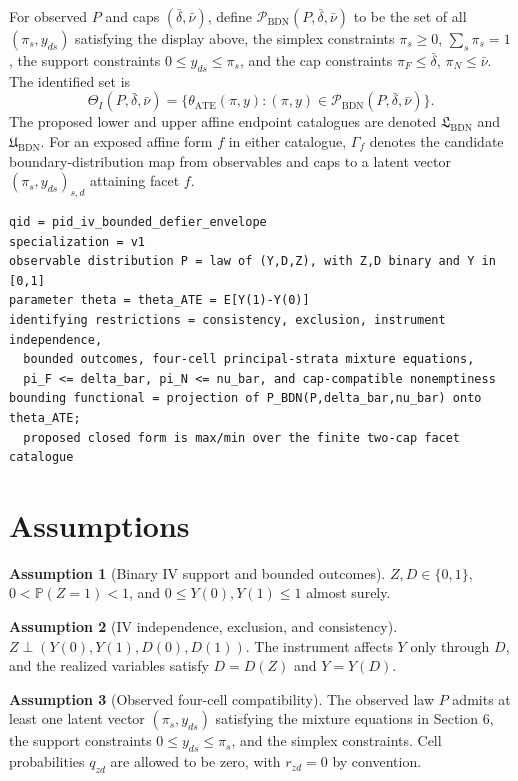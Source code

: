 \documentclass[11pt]{article}
\renewcommand{\Pr}{\mathbb{P}}
\theoremstyle{definition}
\newtheorem{assumption}{Assumption}
\theoremstyle{plain}
\theoremstyle{remark}
\begin{document}
For observed \(P\) and caps \((\bar\delta,\bar\nu)\), define
\(\mathcal{P}_{\mathrm{BDN}}(P,\bar\delta,\bar\nu)\) to be the set of all
\((\pi_s,y_{ds})\) satisfying the display above, the simplex constraints
\(\pi_s\ge0\), \(\sum_s\pi_s=1\), the support constraints
\(0\le y_{ds}\le\pi_s\), and the cap constraints
\(\pi_F\le\bar\delta\), \(\pi_N\le\bar\nu\).  The identified set is
\[
\Theta_I(P,\bar\delta,\bar\nu)
=\{\theta_{\mathrm{ATE}}(\pi,y):(\pi,y)\in
\mathcal{P}_{\mathrm{BDN}}(P,\bar\delta,\bar\nu)\}.
\]
The proposed lower and upper affine endpoint catalogues are denoted
\(\mathfrak{L}_{\mathrm{BDN}}\) and \(\mathfrak{U}_{\mathrm{BDN}}\).  For an
exposed affine form \(f\) in either catalogue, \(\Gamma_f\) denotes the
candidate boundary-distribution map from observables and caps to a latent
vector \((\pi_s,y_{ds})_{s,d}\) attaining facet \(f\).

\begin{verbatim}
qid = pid_iv_bounded_defier_envelope
specialization = v1
observable distribution P = law of (Y,D,Z), with Z,D binary and Y in [0,1]
parameter theta = theta_ATE = E[Y(1)-Y(0)]
identifying restrictions = consistency, exclusion, instrument independence,
  bounded outcomes, four-cell principal-strata mixture equations,
  pi_F <= delta_bar, pi_N <= nu_bar, and cap-compatible nonemptiness
bounding functional = projection of P_BDN(P,delta_bar,nu_bar) onto theta_ATE;
  proposed closed form is max/min over the finite two-cap facet catalogue
\end{verbatim}

\section{Assumptions}
\begin{assumption}[Binary IV support and bounded outcomes]\label{ass:support}
\(Z,D\in\{0,1\}\), \(0<\Pr(Z=1)<1\), and \(0\le Y(0),Y(1)\le1\) almost surely.
\end{assumption}

\begin{assumption}[IV independence, exclusion, and consistency]\label{ass:iv}
\(Z\perp (Y(0),Y(1),D(0),D(1))\).  The instrument affects \(Y\) only through
\(D\), and the realized variables satisfy \(D=D(Z)\) and \(Y=Y(D)\).
\end{assumption}

\begin{assumption}[Observed four-cell compatibility]\label{ass:compatibility}
The observed law \(P\) admits at least one latent vector
\((\pi_s,y_{ds})\) satisfying the mixture equations in Section 6, the support
constraints \(0\le y_{ds}\le\pi_s\), and the simplex constraints.  Cell
probabilities \(q_{zd}\) are allowed to be zero, with \(r_{zd}=0\) by convention.
\end{assumption}
\end{document}
